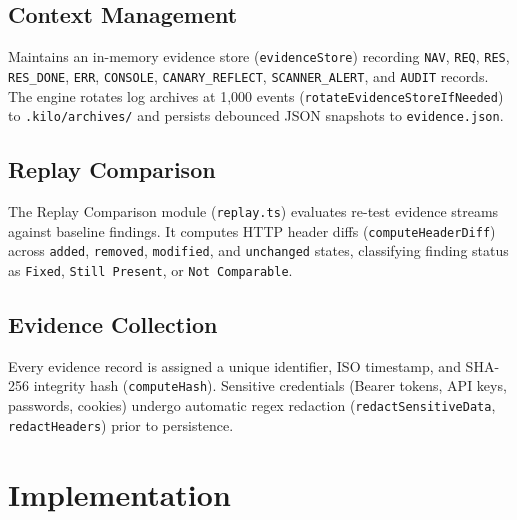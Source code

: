\documentclass[conference]{IEEEtran}
\begin{document}
\subsection{Context Management}
Maintains an in-memory evidence store (\texttt{evidenceStore}) recording \texttt{NAV}, \texttt{REQ}, \texttt{RES}, \texttt{RES\_DONE}, \texttt{ERR}, \texttt{CONSOLE}, \texttt{CANARY\_REFLECT}, \texttt{SCANNER\_ALERT}, and \texttt{AUDIT} records. The engine rotates log archives at 1,000 events (\texttt{rotateEvidenceStoreIfNeeded}) to \texttt{.kilo/archives/} and persists debounced JSON snapshots to \texttt{evidence.json}.

\subsection{Replay Comparison}
The Replay Comparison module (\texttt{replay.ts}) evaluates re-test evidence streams against baseline findings. It computes HTTP header diffs (\texttt{computeHeaderDiff}) across \texttt{added}, \texttt{removed}, \texttt{modified}, and \texttt{unchanged} states, classifying finding status as \texttt{Fixed}, \texttt{Still Present}, or \texttt{Not Comparable}.

\subsection{Evidence Collection}
Every evidence record is assigned a unique identifier, ISO timestamp, and SHA-256 integrity hash (\texttt{computeHash}). Sensitive credentials (Bearer tokens, API keys, passwords, cookies) undergo automatic regex redaction (\texttt{redactSensitiveData}, \texttt{redactHeaders}) prior to persistence.

\section{Implementation}
\end{document}
